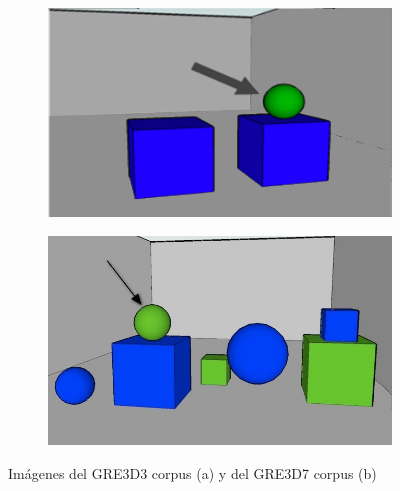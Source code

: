 \begin{figure}[!ht]
\begin{subfigure}{.5\textwidth}
\centering
\includegraphics[width=\textwidth]{images/GRE3D3.png}\\[0pt]
\caption{}
\label{fig-GRE3D3}
\end{subfigure}
\hspace*{0cm}
\begin{subfigure}{.5\textwidth}

\centering
\includegraphics[width=\textwidth]{images/3.jpg}\\[0pt]
\caption{}
\label{fig-GRE3D7}
\end{subfigure}
\caption{Im\'agenes del GRE3D3 corpus (a) y del GRE3D7 corpus (b)}\label{imagenes-GRE3D3-GRE3D7}
\end{figure}


